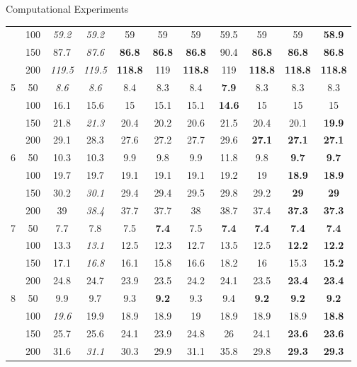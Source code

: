 \documentclass{beamer}
\begin{document}
\begin{frame}{Computational Experiments}
\begin{table}[htbp]
{\begin{tabular}{|c|c|c|c|c|c|c|c|c|c|c|}
         & 100 & \textit{59.2} & \textit{59.2} & 59 & 59 & 59 & 59.5 & 59 & 59 & \textbf{58.9} \\ 
         & 150 &  87.7 & \textit{87.6} & \textbf{86.8} & \textbf{86.8} & \textbf{86.8} & 90.4 & \textbf{86.8} & \textbf{86.8} & \textbf{86.8} \\ 
         & 200 & \textit{119.5} & \textit{119.5} & \textbf{118.8} & 119 & \textbf{118.8} & 119 & \textbf{118.8} & \textbf{118.8} & \textbf{118.8} \\ \hline
        5 & 50 & \textit{8.6} & \textit{8.6} & 8.4 & 8.3 & 8.4 & \textbf{7.9} & 8.3 & 8.3 & 8.3 \\ 
         & 100 & 16.1 & 15.6 & 15 & 15.1 & 15.1 & \textbf{14.6} & 15 & 15 & 15 \\ 
         & 150 & 21.8 & \textit{21.3} & 20.4 & 20.2 & 20.6 & 21.5 & 20.4 & 20.1 & \textbf{19.9} \\ 
         & 200 & 29.1 & 28.3 & 27.6 & 27.2 & 27.7 & 29.6 & \textbf{27.1} & \textbf{27.1} & \textbf{27.1} \\ \hline
        6 & 50 & 10.3 & 10.3 & 9.9 & 9.8 & 9.9 & 11.8 & 9.8 & \textbf{9.7} & \textbf{9.7} \\ 
         & 100 & 19.7 & 19.7 & 19.1 & 19.1 & 19.1 & 19.2 & 19 & \textbf{18.9} & \textbf{18.9} \\ 
         & 150 & 30.2 & \textit{30.1} & 29.4 & 29.4 & 29.5 & 29.8 & 29.2 & \textbf{29} & \textbf{29} \\ 
         & 200 & 39 & \textit{38.4} & 37.7 & 37.7 & 38 & 38.7 & 37.4 & \textbf{37.3} & \textbf{37.3} \\ \hline
        7 & 50 & 7.7 & 7.8 & 7.5 & \textbf{7.4} & 7.5 & \textbf{7.4} & \textbf{7.4} & \textbf{7.4} & \textbf{7.4} \\ 
         & 100 & 13.3 & \textit{13.1} & 12.5 & 12.3 & 12.7 & 13.5 & 12.5 & \textbf{12.2} & \textbf{12.2} \\ 
         & 150 & 17.1 & \textit{16.8} & 16.1 & 15.8 & 16.6 & 18.2 & 16 & 15.3 & \textbf{15.2} \\ 
         & 200 & 24.8 & 24.7 & 23.9 & 23.5 & 24.2 & 24.1 & 23.5 & \textbf{23.4} & \textbf{23.4} \\ \hline
        8 & 50 & 9.9 & 9.7 & 9.3 & \textbf{9.2} & 9.3 & 9.4 & \textbf{9.2} & \textbf{9.2} & \textbf{9.2} \\ 
         & 100 & \textit{19.6} & 19.9 & 18.9 & 18.9 & 19 & 18.9 & 18.9 & 18.9 & \textbf{18.8} \\ 
         & 150 & 25.7 & 25.6 & 24.1 & 23.9 & 24.8 & 26 & 24.1 & \textbf{23.6} & \textbf{23.6} \\ 
         & 200 & 31.6 & \textit{31.1} & 30.3 & 29.9 & 31.1 & 35.8 & 29.8 & \textbf{29.3} & \textbf{29.3} \\ \hline
        \end{tabular}}
        \label{exp:literature_bins}
        \end{table}
        
    \end{frame}
\end{document}
